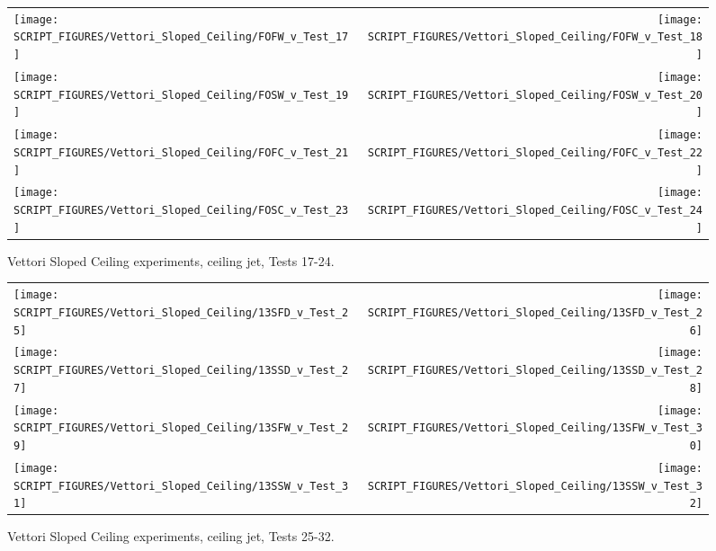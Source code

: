 \begin{figure}[p]
\begin{tabular*}{\textwidth}{l@{\extracolsep{\fill}}r}
\texttt{[image: SCRIPT\_FIGURES/Vettori\_Sloped\_Ceiling/FOFW\_v\_Test\_17]} &
\texttt{[image: SCRIPT\_FIGURES/Vettori\_Sloped\_Ceiling/FOFW\_v\_Test\_18]} \\
\texttt{[image: SCRIPT\_FIGURES/Vettori\_Sloped\_Ceiling/FOSW\_v\_Test\_19]} &
\texttt{[image: SCRIPT\_FIGURES/Vettori\_Sloped\_Ceiling/FOSW\_v\_Test\_20]} \\
\texttt{[image: SCRIPT\_FIGURES/Vettori\_Sloped\_Ceiling/FOFC\_v\_Test\_21]} &
\texttt{[image: SCRIPT\_FIGURES/Vettori\_Sloped\_Ceiling/FOFC\_v\_Test\_22]} \\
\texttt{[image: SCRIPT\_FIGURES/Vettori\_Sloped\_Ceiling/FOSC\_v\_Test\_23]} &
\texttt{[image: SCRIPT\_FIGURES/Vettori\_Sloped\_Ceiling/FOSC\_v\_Test\_24]} \\
\end{tabular*}
\caption{Vettori Sloped Ceiling experiments, ceiling jet, Tests 17-24.}
\label{Vettori_Sloped_3}
\end{figure}

\begin{figure}[p]
\begin{tabular*}{\textwidth}{l@{\extracolsep{\fill}}r}
\texttt{[image: SCRIPT\_FIGURES/Vettori\_Sloped\_Ceiling/13SFD\_v\_Test\_25]} &
\texttt{[image: SCRIPT\_FIGURES/Vettori\_Sloped\_Ceiling/13SFD\_v\_Test\_26]} \\
\texttt{[image: SCRIPT\_FIGURES/Vettori\_Sloped\_Ceiling/13SSD\_v\_Test\_27]} &
\texttt{[image: SCRIPT\_FIGURES/Vettori\_Sloped\_Ceiling/13SSD\_v\_Test\_28]} \\
\texttt{[image: SCRIPT\_FIGURES/Vettori\_Sloped\_Ceiling/13SFW\_v\_Test\_29]} &
\texttt{[image: SCRIPT\_FIGURES/Vettori\_Sloped\_Ceiling/13SFW\_v\_Test\_30]} \\
\texttt{[image: SCRIPT\_FIGURES/Vettori\_Sloped\_Ceiling/13SSW\_v\_Test\_31]} &
\texttt{[image: SCRIPT\_FIGURES/Vettori\_Sloped\_Ceiling/13SSW\_v\_Test\_32]} \\
\end{tabular*}
\caption{Vettori Sloped Ceiling experiments, ceiling jet, Tests 25-32.}
\label{Vettori_Sloped_4}
\end{figure}

